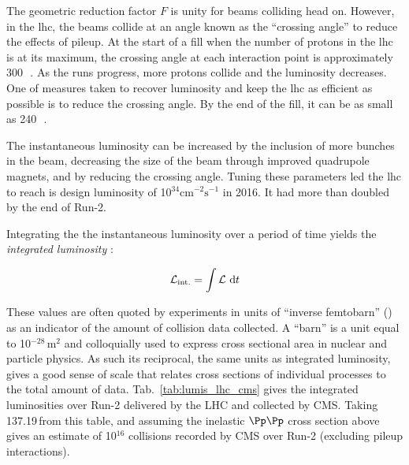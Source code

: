 The geometric reduction factor $F$ is unity for beams colliding head on. However, in the \acrshort{lhc}, the beams collide at an angle known as the ``crossing angle'' to reduce the effects of pileup. At the start of a fill when the number of protons in the \acrshort{lhc} is at its maximum, the crossing angle at each interaction point is approximately 300\,\si{\micro{}}. As the runs progress, more protons collide and the luminosity decreases. One of measures taken to recover luminosity and keep the \acrshort{lhc} as efficient as possible is to reduce the crossing angle. By the end of the fill, it can be as small as 240\,\si{\micro{}}.


The instantaneous luminosity can be increased by the inclusion of more bunches in the beam, decreasing the size of the beam through improved quadrupole magnets, and by reducing the crossing angle. Tuning these parameters led the \acrshort{lhc} to reach is design luminosity of 10$^{34}\text{cm}^{-2}\text{s}^{-1}$ in 2016. It had more than doubled by the end of Run-2.

Integrating the the instantaneous luminosity over a period of time yields the \emph{integrated luminosity} \intlumi:

\begin{equation}
    \intlumi = \int \mathcal{L} \ \mathrm{d}t
    \label{eq:lumi_integrated}
\end{equation}

These values are often quoted by experiments in units of ``inverse femtobarn'' (\fbinv) as an indicator of the amount of collision data collected. A ``barn'' is a unit equal to 10$^{-28}$\,m$^2$ and colloquially used to express cross sectional area in nuclear and particle physics. As such its reciprocal, the same units as integrated luminosity, gives a good sense of scale that relates cross sections of individual processes to the total amount of data. Tab.~\ref{tab:lumis_lhc_cms} gives the integrated luminosities over Run-2 delivered by the LHC and collected by CMS. Taking 137.19\,\fbinv from this table, and assuming the inelastic $\Pp\Pp$ cross section above gives an estimate of 10$^{16}$ collisions recorded by CMS over Run-2 (excluding pileup interactions).




